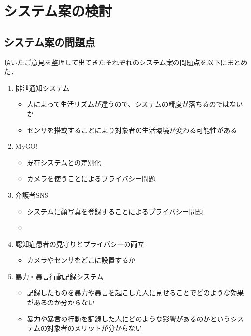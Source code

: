 \documentclass[../report]{subfiles}
\begin{document}
\section{システム案の検討}
\subsection{システム案の問題点}
頂いたご意見を整理して出てきたそれぞれのシステム案の問題点を以下にまとめた．

\begin{enumerate}
    \item[] 排泄通知システム
\begin{itemize}
    \item 人によって生活リズムが違うので、システムの精度が落ちるのではないか
    \item センサを搭載することにより対象者の生活環境が変わる可能性がある
\end{itemize}

    \item[] MyGO!
\begin{itemize}
    \item 既存システムとの差別化
    \item カメラを使うことによるプライバシー問題
\end{itemize}

    \item[] 介護者SNS
\begin{itemize}
    \item システムに顔写真を登録することによるプライバシー問題
    \item 
\end{itemize}

    \item[] 認知症患者の見守りとプライバシーの両立
\begin{itemize}
    \item カメラやセンサをどこに設置するか
\end{itemize}

    \item[] 暴力・暴言行動記録システム
\begin{itemize}
    \item 記録したものを暴力や暴言を起こした人に見せることでどのような効果があるのか分からない
    \item 暴力や暴言の行動を記録した人にどのような影響があるのかというシステムの対象者のメリットが分からない
\end{itemize}
\end{enumerate}
\end{document}
